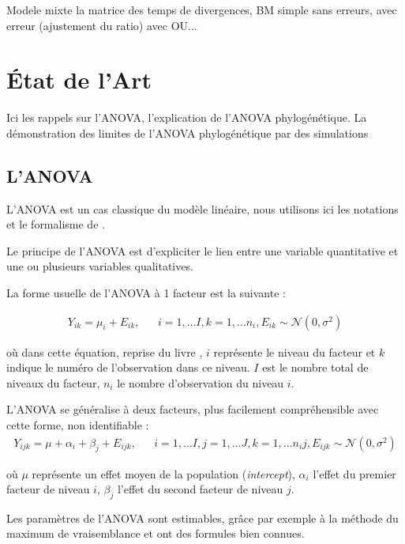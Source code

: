 \documentclass[a4paper, 12pt]{article}\usepackage[]{graphicx}\usepackage[]{xcolor}
\newcommand{\Normal}{\mathcal{N}}
\begin{document}
Modele mixte la matrice des temps de divergences, BM simple sans erreurs, avec erreur (ajustement du ratio) avec OU...

\section{État de l'Art}
\label{chap:etat_art}
Ici les rappels sur l'ANOVA, l'explication de l'ANOVA phylogénétique. La démonstration des limites de l'ANOVA phylogénétique par des simulations

\subsection{L'ANOVA}

L'ANOVA est un cas classique du modèle linéaire, nous utilisons ici les notations et le formalisme de \cite{belModeleLineaireSes}.

Le principe de l'ANOVA est d'expliciter le lien entre une variable quantitative et une ou plusieurs variables qualitatives.

La forme usuelle de l'ANOVA à 1 facteur est la suivante :

\begin{align}
Y_{ik} = \mu_i + E_{ik}, & &i = 1,\dots I, k = 1,\dots n_i, E_{ik} \sim \Normal (0, \sigma^2)
\end{align}

où dans cette équation, reprise du livre \parencite{belModeleLineaireSes}, $i$ représente le niveau du facteur et $k$ indique le numéro de l'observation dans ce niveau. $I$ est le nombre total de niveaux du facteur, $n_i$ le nombre d'observation du niveau $i$. 

L'ANOVA se généralise à deux facteurs, plus facilement compréhensible avec cette forme, non identifiable :
\begin{align}
Y_{ijk} = \mu + \alpha_i + \beta_j + E_{ijk}, & &i = 1,\dots I, j = 1,\dots J, k = 1,\dots n_ij, E_{ijk} \sim \Normal (0, \sigma^2)
\end{align}

où $\mu$ représente un effet moyen de la population (\emph{intercept}), $\alpha_i$ l'effet du premier facteur de niveau $i$, $\beta_j$ l'effet du second facteur de niveau $j$.

Les paramètres de l'ANOVA sont estimables, grâce par exemple à la méthode du maximum de vraisemblance et ont des formules bien connues.

\end{document}
